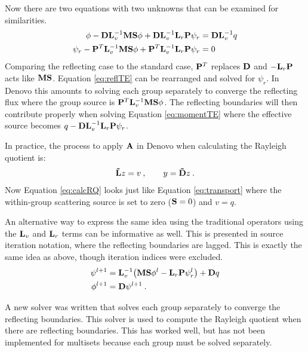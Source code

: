 Now there are two equations with two unknowns that can be examined for similarities.
\begin{align}
  \phi - \mathbf{DL}_{v}^{-1}\mathbf{MS}\phi + \mathbf{DL}_{v}^{-1}\mathbf{L}_{r}\mathbf{P} \psi_{r} &= \mathbf{DL}_{v}^{-1} q 
\label{eq:momentTE} \\
  \psi_{r} - \mathbf{P}^{T}\mathbf{L}_{v}^{-1}\mathbf{MS} \phi + \mathbf{P}^{T}\mathbf{L}_{v}^{-1} \mathbf{L}_{r} \mathbf{P} \psi_{r} &= 0 
\label{eq:reflTE}
\end{align}
Comparing the reflecting case to the standard case, $\mathbf{P}^{T}$ replaces $\mathbf{D}$ and $-\mathbf{L}_{r}\mathbf{P}$ acts like $\mathbf{MS}$. Equation \eqref{eq:reflTE} can be rearranged and solved for $\psi_{r}$. In Denovo this amounts to solving each group separately to converge the reflecting flux where the group source is $\mathbf{P}^{T}\mathbf{L}_{v}^{-1}\mathbf{MS} \phi$. The reflecting boundaries will then contribute properly when solving Equation \eqref{eq:momentTE} where the effective source becomes $q - \mathbf{DL}_{v}^{-1}\mathbf{L}_{r}\mathbf{P} \psi_{r}$.  

In practice, the process to apply $\mathbf{A}$ in Denovo when calculating the Rayleigh quotient is:
%
\begin{alignat}{2}
  \mathbf{\tilde{L}} z = v \:, \qquad y = \mathbf{\tilde{D}}z \:.
\label{eq:calcRQ}
\end{alignat}
%
Now Equation \eqref{eq:calcRQ} looks just like Equation \eqref{eq:transport} where the within-group scattering source is set to zero ($\mathbf{S} = 0$) and $v = q$. 

An alternative way to express the same idea using the traditional operators using the $\mathbf{L}_{v}$ and $\mathbf{L}_{r}$ terms can be informative as well. This is presented in source iteration notation, where the reflecting boundaries are lagged. This is exactly the same idea as above, though iteration indices were excluded.
\begin{align}
  \psi^{l+1} &= \mathbf{L}_{v}^{-1} \bigl( \mathbf{MS} \phi^{l} - \mathbf{L}_{r} \mathbf{P} \psi_{r}^{l} \bigr) + \mathbf{D}q 
\label{eq:laggedSI} \\
  \phi^{l+1} &= \mathbf{D}\psi^{l+1} \:.
\end{align}

A new solver was written that solves each group separately to converge the reflecting boundaries. This solver is used to compute the Rayleigh quotient when there are reflecting boundaries. This has worked well, but has not been implemented for multisets because each group must be solved separately. 


